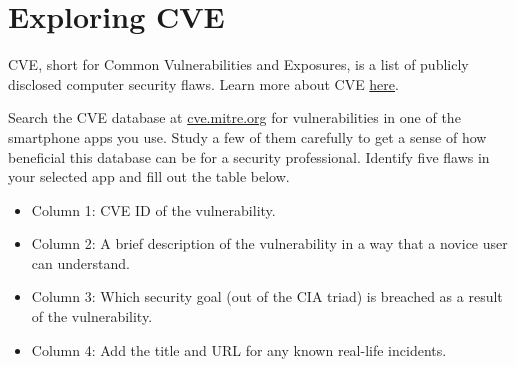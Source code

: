 \documentclass[11pt,letterpaper]{article}
\begin{document}

\section*{Exploring CVE}
%

CVE, short for Common Vulnerabilities and Exposures, is a list of publicly disclosed computer security flaws. Learn more about CVE \href{https://www.redhat.com/en/topics/security/what-is-cve}{here}. 

Search the CVE database at \href{https://cve.mitre.org/}{cve.mitre.org} for vulnerabilities in one of the smartphone apps you use. Study a few of them carefully to get a sense of how beneficial this database can be for a security professional. Identify five flaws in your selected app and fill out the table below. 

\begin{itemize}
    \item Column 1: CVE ID of the vulnerability.
    \item Column 2: A brief description of the vulnerability in a way that a novice user can understand.
    \item Column 3: Which security goal (out of the CIA triad) is breached as a result of the vulnerability.
    \item Column 4: Add the title and URL for any known real-life incidents.
\end{itemize}
\end{document}
